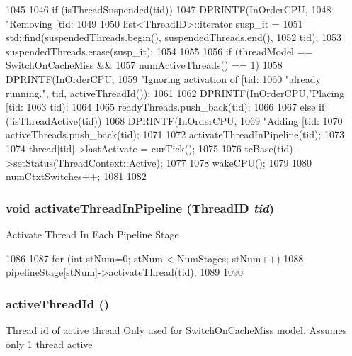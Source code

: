 \begin{DoxyCode}
1045 {
1046     if (isThreadSuspended(tid)) {
1047         DPRINTF(InOrderCPU,
1048                 "Removing [tid:%
1049 
1050         list<ThreadID>::iterator susp_it =
1051             std::find(suspendedThreads.begin(), suspendedThreads.end(), 
1052                       tid);
1053         suspendedThreads.erase(susp_it);                        
1054     }
1055 
1056     if (threadModel == SwitchOnCacheMiss &&
1057         numActiveThreads() == 1) {
1058         DPRINTF(InOrderCPU,
1059                 "Ignoring activation of [tid:%
1060                 "already running.\n", tid, activeThreadId());
1061         
1062         DPRINTF(InOrderCPU,"Placing [tid:%
1063                 tid);        
1064 
1065         readyThreads.push_back(tid);
1066         
1067     } else if (!isThreadActive(tid)) {                
1068         DPRINTF(InOrderCPU,
1069                 "Adding [tid:%
1070         activeThreads.push_back(tid);
1071         
1072         activateThreadInPipeline(tid);
1073 
1074         thread[tid]->lastActivate = curTick();            
1075 
1076         tcBase(tid)->setStatus(ThreadContext::Active);    
1077 
1078         wakeCPU();
1079 
1080         numCtxtSwitches++;        
1081     }
1082 }
\end{DoxyCode}
\hypertarget{classInOrderCPU_a1bd67266499bbc86c4c378d3e7d9256e}{
\subsubsection[{activateThreadInPipeline}]{\setlength{\rightskip}{0pt plus 5cm}void activateThreadInPipeline ({\bf ThreadID} {\em tid})}}
\label{classInOrderCPU_a1bd67266499bbc86c4c378d3e7d9256e}
Activate Thread In Each Pipeline Stage 


\begin{DoxyCode}
1086 {
1087     for (int stNum=0; stNum < NumStages; stNum++) {
1088         pipelineStage[stNum]->activateThread(tid);
1089     }    
1090 }
\end{DoxyCode}
\hypertarget{classInOrderCPU_afd3a99df15e8ddc77ec8615ca02fcb4a}{
\subsubsection[{activeThreadId}]{ activeThreadId ()}}
\label{classInOrderCPU_afd3a99df15e8ddc77ec8615ca02fcb4a}
Thread id of active thread Only used for SwitchOnCacheMiss model. Assumes only 1 thread active 


